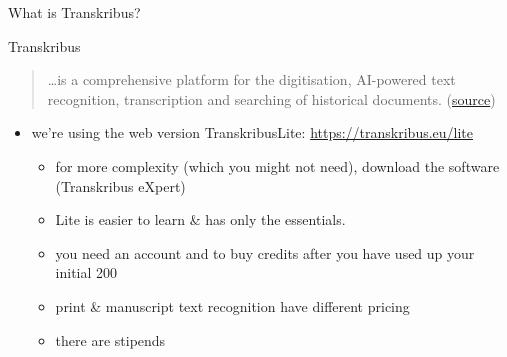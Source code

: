 \begin{frame}{What is Transkribus?}
    \begin{block}{Transkribus}
       \begin{quote}
           \dots{}is a comprehensive platform for the digitisation, AI-powered text recognition, transcription and searching of historical documents. (\href{https://readcoop.eu/transkribus/}{source})
       \end{quote}
    \end{block}
    \begin{itemize}
        \item we're using the web version TranskribusLite: \protect\url{https://transkribus.eu/lite}
        \begin{itemize}
            \item for more complexity (which you might not need), download the software (Transkribus eXpert)
            \item Lite is easier to learn \& has only the essentials.
            \item you need an account and to buy credits after you have used up your initial 200
            \item print \& manuscript text recognition have different pricing
            \item there are stipends
        \end{itemize}        
    \end{itemize}
\end{frame}



